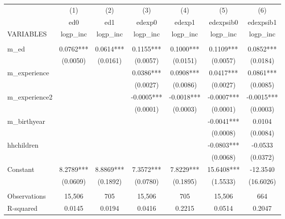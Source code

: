 \begin{tabular}{lcccccc} \hline
 & (1) & (2) & (3) & (4) & (5) & (6) \\
 & ed0 & ed1 & edexp0 & edexp1 & edexpsib0 & edexpsib1 \\
VARIABLES & logp\_inc & logp\_inc & logp\_inc & logp\_inc & logp\_inc & logp\_inc \\ \hline
 &  &  &  &  &  &  \\
m\_ed & 0.0762*** & 0.0614*** & 0.1155*** & 0.1000*** & 0.1109*** & 0.0852*** \\
 & (0.0050) & (0.0161) & (0.0057) & (0.0151) & (0.0057) & (0.0184) \\
m\_experience &  &  & 0.0386*** & 0.0908*** & 0.0417*** & 0.0861*** \\
 &  &  & (0.0027) & (0.0086) & (0.0027) & (0.0085) \\
m\_experience2 &  &  & -0.0005*** & -0.0018*** & -0.0007*** & -0.0015*** \\
 &  &  & (0.0001) & (0.0003) & (0.0001) & (0.0003) \\
m\_birthyear &  &  &  &  & -0.0041*** & 0.0104 \\
 &  &  &  &  & (0.0008) & (0.0084) \\
hhchildren &  &  &  &  & -0.0803*** & -0.0533 \\
 &  &  &  &  & (0.0068) & (0.0372) \\
Constant & 8.2789*** & 8.8869*** & 7.3572*** & 7.8229*** & 15.6408*** & -12.3540 \\
 & (0.0609) & (0.1892) & (0.0780) & (0.1895) & (1.5533) & (16.6026) \\
 &  &  &  &  &  &  \\
Observations & 15,506 & 705 & 15,506 & 705 & 15,506 & 664 \\
 R-squared & 0.0145 & 0.0194 & 0.0416 & 0.2215 & 0.0514 & 0.2047 \\ \hline
\end{tabular}
